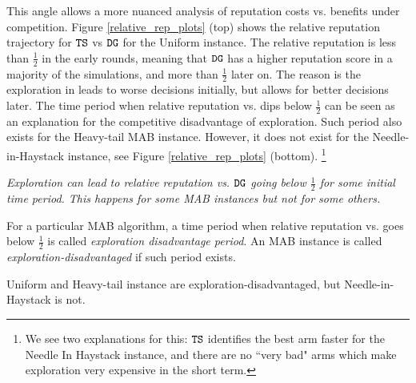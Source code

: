 \documentclass[../competing_bandits.tex]{subfiles}
\begin{document}
This angle allows a more nuanced analysis of reputation costs vs. benefits under competition. Figure \ref{relative_rep_plots} (top) shows the relative reputation trajectory for $\mathtt{TS}$ vs $\mathtt{DG}$ for the Uniform instance. The relative reputation is less than $\tfrac12$ in the early rounds, meaning that $\mathtt{DG}$ has a higher reputation score in a majority of the simulations, and more than $\tfrac12$ later on. The reason is the exploration in \TS leads to worse decisions initially, but allows for better decisions later. The time period when relative reputation vs. \DG dips below $\tfrac12$ can be seen as an explanation for the competitive disadvantage of exploration. Such period also exists for the Heavy-tail MAB instance. However, it does not exist for the Needle-in-Haystack instance, see Figure \ref{relative_rep_plots} (bottom).%
\footnote{We see two explanations for this: $\mathtt{TS}$ identifies the best arm faster for the Needle In Haystack instance, and there are no ``very bad" arms which make exploration very expensive in the short term.}


\begin{finding}\label{find:period}
\textit{Exploration can lead to relative reputation vs. $\mathtt{DG}$ going below $\tfrac12$ for some initial time period. This happens for some MAB instances but not for some others.}
\end{finding}

\begin{definition}
For a particular MAB algorithm, a time period when relative reputation vs. \DG goes below $\tfrac12$ is called {\em exploration disadvantage period}. An MAB instance is called \emph{exploration-disadvantaged} if such period exists.
\end{definition}

\noindent Uniform and Heavy-tail instance are exploration-disadvantaged, but Needle-in-Haystack is not.
\end{document}
